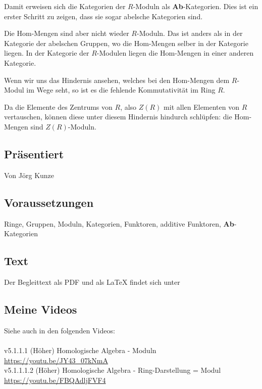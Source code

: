 \documentclass[a4paper]{amsart}
\theoremstyle{definition}
\begin{document}
Damit erweisen sich die Kategorien der $R$-Moduln als \textbf{Ab}-Kategorien. Dies ist ein erster Schritt zu zeigen, dass sie sogar abelsche Kategorien sind.

Die Hom-Mengen sind aber nicht wieder $R$-Moduln. Das ist anders als in der Kategorie der abelschen Gruppen, wo die Hom-Mengen selber in der Kategorie liegen. In der Kategorie der $R$-Modulen liegen die Hom-Mengen in einer anderen Kategorie.

Wenn wir uns das Hindernis ansehen, welches bei den Hom-Mengen dem $R$-Modul im Wege seht, so ist es die fehlende Kommutativität im Ring $R$.

Da die Elemente des Zentrums von $R$, also $Z(R)$ mit allen Elementen von $R$ vertauschen, können diese unter diesem Hindernis hindurch schlüpfen: die Hom-Mengen sind $Z(R)$-Moduln.

\subsection*{Präsentiert}
Von Jörg Kunze

\subsection*{Voraussetzungen}
Ringe, Gruppen, Moduln, Kategorien, Funktoren, additive Funktoren, \textbf{Ab}-Kategorien

\subsection*{Text}
Der Begleittext als PDF und als LaTeX findet sich unter
{\tiny
   \url{}
}

\subsection*{Meine Videos}
Siehe auch in den folgenden Videos:\\
\\
v5.1.1.1 (Höher) Homologische Algebra - Moduln\\
\url{https://youtu.be/JY43_07kNmA}
\\
v5.1.1.1.2 (Höher) Homologische Algebra - Ring-Darstellung = Modul\\
\url{https://youtu.be/FBQAdljFVF4}
\end{document}
